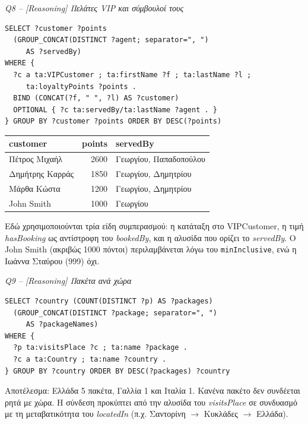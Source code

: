 \documentclass[conference]{IEEEtran}
\newcommand{\query}[1]{\par\medskip\noindent\textit{#1}\par\nobreak\smallskip}
\newcommand{\cls}[1]{\textsf{#1}}          %
\newcommand{\prop}[1]{\textit{#1}}         %
\begin{document}
\query{Q8 -- [Reasoning] Πελάτες VIP και σύμβουλοί τους}
\begin{lstlisting}
SELECT ?customer ?points
  (GROUP_CONCAT(DISTINCT ?agent; separator=", ")
     AS ?servedBy)
WHERE {
  ?c a ta:VIPCustomer ; ta:firstName ?f ; ta:lastName ?l ;
     ta:loyaltyPoints ?points .
  BIND (CONCAT(?f, " ", ?l) AS ?customer)
  OPTIONAL { ?c ta:servedBy/ta:lastName ?agent . }
} GROUP BY ?customer ?points ORDER BY DESC(?points)
\end{lstlisting}
\begin{center}\scriptsize\setlength{\tabcolsep}{4pt}
\begin{tabular}{@{}lrl@{}}
\toprule
customer & points & servedBy \\
\midrule
Πέτρος Μιχαήλ & 2600 & Γεωργίου, Παπαδοπούλου \\
Δημήτρης Καρράς & 1850 & Γεωργίου, Δημητρίου \\
Μάρθα Κώστα & 1200 & Γεωργίου, Δημητρίου \\
John Smith & 1000 & Γεωργίου \\
\bottomrule
\end{tabular}\end{center}
Εδώ χρησιμοποιούνται τρία είδη συμπερασμού: η κατάταξη στο \cls{VIPCustomer}, η
τιμή \prop{hasBooking} ως αντίστροφη του \prop{bookedBy}, και η αλυσίδα που ορίζει
το \prop{servedBy}. Ο John Smith (ακριβώς 1000 πόντοι) περιλαμβάνεται λόγω του
\texttt{minInclusive}, ενώ η Ιωάννα Σταύρου (999) όχι.

\query{Q9 -- [Reasoning] Πακέτα ανά χώρα}
\begin{lstlisting}
SELECT ?country (COUNT(DISTINCT ?p) AS ?packages)
  (GROUP_CONCAT(DISTINCT ?package; separator=", ")
     AS ?packageNames)
WHERE {
  ?p ta:visitsPlace ?c ; ta:name ?package .
  ?c a ta:Country ; ta:name ?country .
} GROUP BY ?country ORDER BY DESC(?packages) ?country
\end{lstlisting}
Αποτέλεσμα: Ελλάδα 5 πακέτα, Γαλλία 1 και Ιταλία 1. Κανένα πακέτο δεν συνδέεται
ρητά με χώρα. Η σύνδεση προκύπτει από την αλυσίδα του \prop{visitsPlace} σε
συνδυασμό με τη μεταβατικότητα του \prop{locatedIn} (π.χ. Σαντορίνη $\rightarrow$
Κυκλάδες $\rightarrow$ Ελλάδα).
\end{document}
